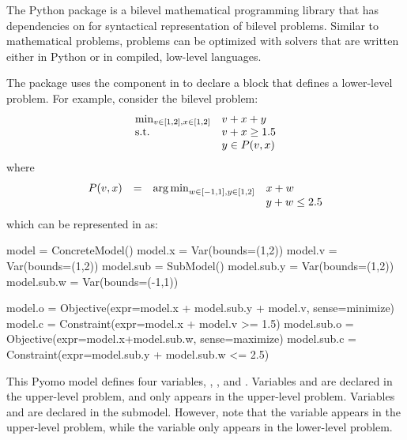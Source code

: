 The Python package  is a bilevel mathematical programming library that has dependencies on  for syntactical representation of bilevel problems. Similar to  mathematical problems,  problems can be optimized with solvers that are written either in Python or in compiled, low-level languages.

The  package uses the  component in  to declare a block that defines a lower-level problem. 
For example, consider the bilevel problem:
\begin{equation}
\label{eqn:bilevel_ex1}
\begin{array}{ll}
\min_{v \in [1,2], x \in [1,2]}   & v + x + y\\
\textrm{s.t.}                 & v + x\geq 1.5\\
                    & y \in P(v,x)
\end{array}
\end{equation}
where 
\[
\begin{array}{llll}
P(v,x) & = & \operatorname*{arg\,min}_{w \in [-1,1], y \in [1,2]}    & x + w\\
 & &                            &  y + w \leq 2.5
\end{array}
\]
which can be represented in  as:

\begin{qlisting}
model = ConcreteModel()
model.x = Var(bounds=(1,2))
model.v = Var(bounds=(1,2))
model.sub = SubModel()
model.sub.y = Var(bounds=(1,2))
model.sub.w = Var(bounds=(-1,1))

model.o = Objective(expr=model.x + model.sub.y + model.v, sense=minimize)
model.c = Constraint(expr=model.x + model.v >= 1.5)
model.sub.o = Objective(expr=model.x+model.sub.w, sense=maximize)
model.sub.c = Constraint(expr=model.sub.y + model.sub.w <= 2.5)
\end{qlisting}
This Pyomo model defines four variables, , ,  and .
Variables  and  are declared in the upper-level
problem, and  only appears in the upper-level problem.
Variables  and  are declared in the submodel.
However, note that the  variable appears in the upper-level
problem, while the  variable only appears in the
lower-level problem.

